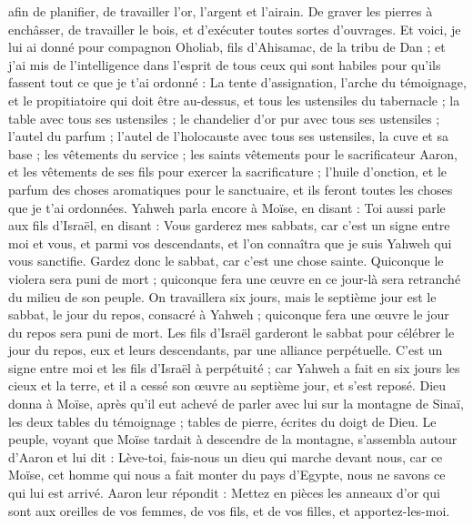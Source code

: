 \begin{multicols}{2}
afin de planifier, de travailler l’or, l’argent et l’airain.
De graver les pierres à enchâsser, de travailler le bois, et d’exécuter toutes sortes d’ouvrages.
Et voici, je lui ai donné pour compagnon Oholiab, fils d'Ahisamac, de la tribu de Dan ; et j'ai mis de l’intelligence dans l’esprit de tous ceux qui sont habiles pour qu'ils fassent tout ce que je t’ai ordonné :
La tente d'assignation, l'arche du témoignage, et le propitiatoire qui doit être au-dessus, et tous les ustensiles du tabernacle ;
la table avec tous ses ustensiles ; le chandelier d’or pur avec tous ses ustensiles ; l'autel du parfum ;
l'autel de l'holocauste avec tous ses ustensiles, la cuve et sa base ;
les vêtements du service ; les saints vêtements pour le sacrificateur Aaron, et les vêtements de ses fils pour exercer la sacrificature ;
l'huile d'onction, et le parfum des choses aromatiques pour le sanctuaire, et ils feront toutes les choses que je t'ai ordonnées.
Yahweh parla encore à Moïse, en disant :
Toi aussi parle aux fils d'Israël, en disant : Vous garderez mes sabbats, car c'est un signe entre moi et vous, et parmi vos descendants, et l’on connaîtra que je suis Yahweh qui vous sanctifie.
Gardez donc le sabbat, car c’est une chose sainte. Quiconque le violera sera puni de mort ; quiconque fera une œuvre en ce jour-là sera retranché du milieu de son peuple.
On travaillera six jours, mais le septième jour est le sabbat, le jour du repos, consacré à Yahweh ; quiconque fera une œuvre le jour du repos sera puni de mort.
Les fils d'Israël garderont le sabbat pour célébrer le jour du repos, eux et leurs descendants, par une alliance perpétuelle.
C'est un signe entre moi et les fils d'Israël à perpétuité ; car Yahweh a fait en six jours les cieux et la terre, et il a cessé son œuvre au septième jour, et s'est reposé.
Dieu donna à Moïse, après qu'il eut achevé de parler avec lui sur la montagne de Sinaï, les deux tables du témoignage ; tables de pierre, écrites du doigt de Dieu.
\VerseOne{}Le peuple, voyant que Moïse tardait à descendre de la montagne, s'assembla autour d’Aaron et lui dit : Lève-toi, fais-nous un dieu qui marche devant nous, car ce Moïse, cet homme qui nous a fait monter du pays d'Egypte, nous ne savons ce qui lui est arrivé.
Aaron leur répondit : Mettez en pièces les anneaux d'or qui sont aux oreilles de vos femmes, de vos fils, et de vos filles, et apportez-les-moi.

\end{multicols}
